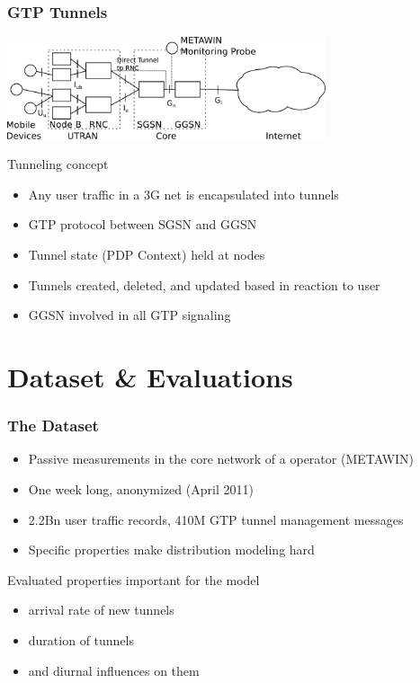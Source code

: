 \documentclass{beamer}
\begin{document}
\begin{frame}
    \frametitle{GTP Tunnels}

      \begin{center}
		\includegraphics[height=3cm]{figures/umts-network.pdf}
	\end{center}


	Tunneling concept
    \begin{itemize}
		\item Any user traffic in a 3G net is encapsulated into tunnels
		\item GTP protocol between SGSN and GGSN
		\item Tunnel state (PDP Context) held at nodes
		\item Tunnels created, deleted, and updated based in reaction to user
		\item GGSN involved in all GTP signaling
	\end{itemize}
\end{frame}


\section{Dataset \& Evaluations}

\begin{frame}
	\frametitle{The Dataset}

	\begin{itemize}
		\item Passive measurements in the core network of a operator (METAWIN)
		\item One week long, anonymized (April 2011)
		\item 2.2Bn user traffic records, 410M GTP tunnel management messages
		\item Specific properties make distribution modeling hard 
	\end{itemize}

	Evaluated properties important for the model
	\begin{itemize}
		\item arrival rate of new tunnels
		\item duration of tunnels
		\item and diurnal influences on them
	\end{itemize}

\end{frame}
\end{document}
